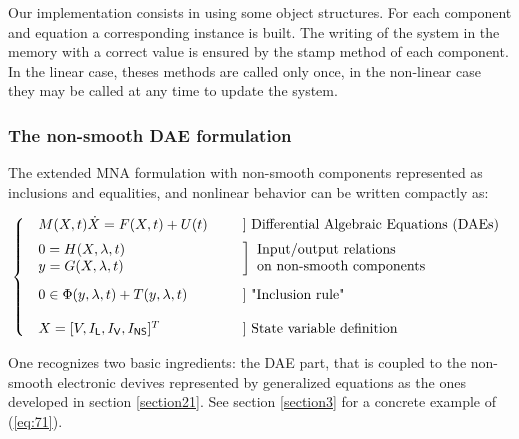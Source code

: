 \documentclass{article}
\begin{document}
Our implementation consists in using some object structures. For each component
and equation a corresponding instance is built. The writing of the system in the memory with a correct value is ensured by the stamp method of each component. In the linear
case, theses methods are called only once, in the non-linear case they may be called at any time to update the system.


\subsubsection{The non-smooth DAE formulation}


The extended MNA formulation with non-smooth components represented as inclusions and equalities, and nonlinear behavior can  be written compactly as:

\begin{equation}
  \label{eq:71}
 \left\{ \begin{array}{l l l}
    \begin{array}{l}
  M(X,t) \dot X = F(X,t) + U(t)
\end{array}
& & ]\text{ Differential Algebraic Equations (DAEs)}\\[2mm]
  \begin{array}{l}
    0 = H(X,\lambda,t)\\
    y = G(X,\lambda,t) 
  \end{array} &  & \bigg]\begin{array}{l}
   \text{Input/output relations }\\
   \text{on non-smooth components}
  \end{array}  \\[5mm]
  \begin{array}{l}
  0 \in \Phi(y,\lambda,t) + T(y,\lambda,t)
\end{array}
&  & ] \text{ "Inclusion rule"}\\ \\
 \begin{array}{l}X =[V,I_{\mathsf L}, I_{\mathsf V}, I_{\mathsf{NS}}]^T
 \end{array}
 & &] \text{ State variable definition}\\
\end{array}\right.
\end{equation}


One recognizes two basic ingredients: the DAE part, that is coupled to the non-smooth electronic devives represented by generalized equations as the ones developed in section \ref{section21}. See section \ref{section3} for a concrete example of (\ref{eq:71}). 
\end{document}
